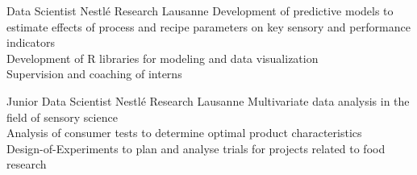 \documentclass{yalcv}
\begin{document}
\begin{cvbody}
	{Data Scientist}
	{Nestlé Research Lausanne}
	{Development of predictive models to estimate effects of process and recipe parameters on
		key sensory and performance indicators\\
		Development of R libraries for modeling and data visualization\\
		Supervision and coaching of interns}

	{Junior Data Scientist}
	{Nestlé Research Lausanne}
	{Multivariate data analysis in the field of sensory science\\
		Analysis of consumer tests to determine optimal product characteristics\\
		Design-of-Experiments to plan and analyse trials for projects related to food research}
\end{cvbody}
\end{document}
